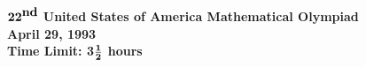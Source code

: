 \pagestyle{empty}
\setlength{\oddsidemargin}{.15in}
\setlength{\evensidemargin}{.15in}
\setlength{\textwidth}{6.05in}
\setlength{\textheight}{9in}
\setlength{\topmargin}{0in}
\setlength{\headheight}{0in}
\setlength{\headsep}{0in}
\setlength{\parskip}{15pt}
\setlength{\labelsep}{15pt}
\setlength{\medskipamount}{3ex} 
\setlength{\smallskipamount}{1ex}
\def\binom#1#2{{#1\choose#2}}
\def\dg{\raisebox{.15pt}{$^{\circ}$}}
\def\RR{{\mathbf{R}}}
\newenvironment{List}{%
    \begin{list}{}{\setlength{\labelwidth}{.15in}
    \setlength{\leftmargin}{.55in}
    \setlength{\rightmargin}{.25in}
    \setlength{\topsep}{0pt}
    \setlength{\partopsep}{0pt} 
    }}{\end{list}}
\newtheorem{fact}{Proposition}

\setlength{\baselineskip}{.25in}
\begin{center}
${\bf 22}^{\mbox{\bf nd}}$ {\bf United States of America
Mathematical
Olympiad}
\\[.1in]
{\bf April 29, 1993}\\
{\bf Time Limit: 3}${{\bf 1}\over{\bf 2}}$ {\bf
hours}
\end{center}
